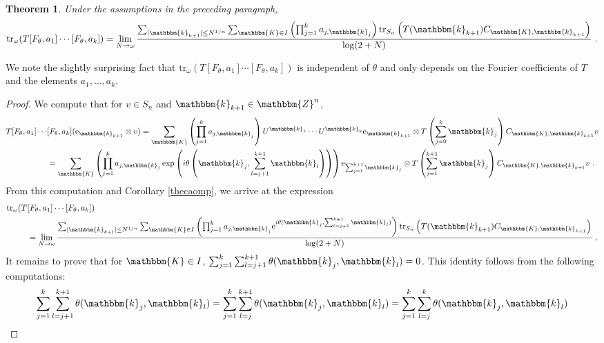 \documentclass[10pt]{amsart}
\newtheorem{thm}{Theorem}[section]
\theoremstyle{remark}
\theoremstyle{definition}
\begin{document}
\begin{thm}
\label{compuatthm}
Under the assumptions in the preceding paragraph, 
$${\mathrm{t}\mathrm{r}}_\omega(T[F_\theta,a_1]\cdots[F_\theta,a_k])=\lim_{N\to \omega}
\frac{\sum_{|\mathbbm{k}_{k+1}|\leq N^{1/n}}\sum_{\mathbbm{K}\in I} \left(\prod_{j=1}^k a_{j,\mathbbm{k}_j}\right){\mathrm{t}\mathrm{r}}_{S_n}\left(T(\mathbbm{k}_{k+1})C_{\mathbbm{K},\mathbbm{k}_{k+1}}\right)}{\log(2+N)}\ .$$
\end{thm}

We note the slightly surprising fact that ${\mathrm{t}\mathrm{r}}_\omega(T[F_\theta,a_1]\cdots[F_\theta,a_k])$ is independent of $\theta$ and only depends on the Fourier coefficients of $T$ and the elements $a_1,\ldots, a_k$.

\begin{proof}
We compute that for $v\in S_n$ and $\mathbbm{k}_{k+1}\in {\mathbbm{Z}}^n$,
\begin{align*}
T[F_\theta,a_1]\cdots&[F_\theta,a_k]({\mathrm{e}}_{\mathbbm{k}_{k+1}}\otimes v)=\sum_{\mathbbm{K}} \left(\prod_{j=1}^k a_{j,\mathbbm{k}_j}\right) U^{\mathbbm{k}_1}\cdots U^{\mathbbm{k}_k}{\mathrm{e}}_{\mathbbm{k}_{k+1}}\otimes T\left(\sum_{j=0}^k\mathbbm{k}_j\right)C_{\mathbbm{K},\mathbbm{k}_{k+1}}v\\
&=\sum_{\mathbbm{K}} \left(\prod_{j=1}^k a_{j,\mathbbm{k}_j}\exp\left(i\theta\left(\mathbbm{k}_{j},\sum_{l=j+1}^{k+1} \mathbbm{k}_l\right)\right)\right) {\mathrm{e}}_{\sum_{j=1}^{k+1}\mathbbm{k}_{j}}\otimes T\left(\sum_{j=1}^{k+1}\mathbbm{k}_j\right)C_{\mathbbm{K},\mathbbm{k}_{k+1}}v\ .
\end{align*}
From this computation and Corollary \ref{thecaomp}, we arrive at the expression
\begin{align*}
{\mathrm{t}\mathrm{r}}_\omega(T&[F_\theta,a_1]\cdots[F_\theta,a_k])\\
&=\lim_{N\to \omega}
\frac{\sum_{|\mathbbm{k}_{k+1}|\leq N^{1/n}}\sum_{\mathbbm{K}\in I} \left(\prod_{j=1}^k a_{j,\mathbbm{k}_j}{\mathrm{e}}^{i\theta(\mathbbm{k}_{j},\sum_{l=j+1}^{k+1} \mathbbm{k}_l)}\right){\mathrm{t}\mathrm{r}}_{S_n}\left(T(\mathbbm{k}_{k+1})C_{\mathbbm{K},\mathbbm{k}_{k+1}}\right)}{\log(2+N)}\ .
\end{align*}
It remains to prove that for $\mathbbm{K}\in I$, $\sum_{j=1}^k\sum_{l=j+1}^{k+1}\theta(\mathbbm{k}_{j}, \mathbbm{k}_l)=0$. This identity follows from the following computations:
\begin{align*}
\sum_{j=1}^k\sum_{l=j+1}^{k+1}\theta(\mathbbm{k}_{j},\mathbbm{k}_l)&=\sum_{j=1}^k\sum_{l=j}^{k+1}\theta(\mathbbm{k}_{j}, \mathbbm{k}_l)=\sum_{j=1}^k\sum_{l=j}^{k}\theta(\mathbbm{k}_{j}, \mathbbm{k}_l)\\

\end{align*}
\end{proof}
\end{document}
